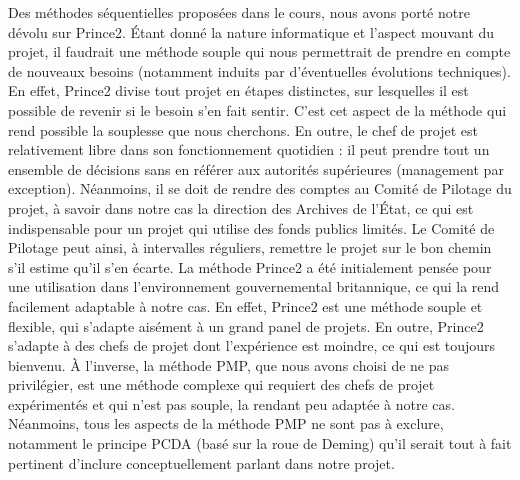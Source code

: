 \documentclass[a4paper,12pt]{article}
\begin{document}
Des méthodes séquentielles proposées dans le cours, nous avons porté notre dévolu sur Prince2. Étant donné la nature informatique et l’aspect mouvant du projet, il faudrait une méthode souple qui nous permettrait de prendre en compte de nouveaux besoins (notamment induits par d'éventuelles évolutions techniques). En effet, Prince2 divise tout projet en étapes distinctes, sur lesquelles il est possible de revenir si le besoin s’en fait sentir. C’est cet aspect de la méthode qui rend possible la souplesse que nous cherchons.
En outre, le chef de projet est relativement libre dans son fonctionnement quotidien : il peut prendre tout un ensemble de décisions sans en référer aux autorités supérieures (management par exception). Néanmoins, il se doit de rendre des comptes au Comité de Pilotage du projet, à savoir dans notre cas la direction des Archives de l’État, ce qui est indispensable pour un projet qui utilise des fonds publics limités. Le Comité de Pilotage peut ainsi, à intervalles réguliers, remettre le projet sur le bon chemin s’il estime qu’il s’en écarte.
La méthode Prince2 a été initialement pensée pour une utilisation dans l’environnement gouvernemental britannique, ce qui la rend facilement adaptable à notre cas. En effet, Prince2 est une méthode souple et flexible, qui s’adapte aisément à un grand panel de projets. En outre, Prince2 s’adapte à des chefs de projet dont l’expérience est moindre, ce qui est toujours bienvenu.
À l’inverse, la méthode PMP, que nous avons choisi de ne pas privilégier, est une méthode complexe qui requiert des chefs de projet expérimentés et qui n’est pas souple, la rendant peu adaptée à notre cas. Néanmoins, tous les aspects de la méthode PMP ne sont pas à exclure, notamment le principe PCDA (basé sur la roue de Deming) qu’il serait tout à fait pertinent d’inclure conceptuellement parlant dans notre projet.
\end{document}
